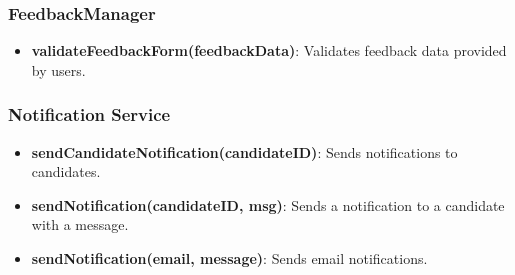 \subsubsection{FeedbackManager}
\begin{itemize}
    \item \textbf{validateFeedbackForm(feedbackData)}: Validates feedback data provided by users.
\end{itemize}

\subsubsection{Notification Service}
\begin{itemize}
    \item \textbf{sendCandidateNotification(candidateID)}: Sends notifications to candidates.
    \item \textbf{sendNotification(candidateID, msg)}: Sends a notification to a candidate with a message.
    \item \textbf{sendNotification(email, message)}: Sends email notifications.
\end{itemize}

